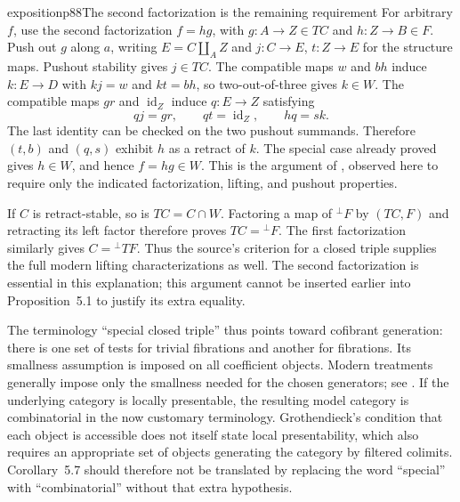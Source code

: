 \begin{dcomment}{exposition}{p88}{The second factorization is the remaining requirement}
For arbitrary $f$, use the second factorization $f=hg$, with $g:A\to Z\in TC$ and $h:Z\to B\in F$. Push out $g$ along $a$, writing $E=C\amalg_A Z$ and $j:C\to E$, $t:Z\to E$ for the structure maps. Pushout stability gives $j\in TC$. The compatible maps $w$ and $bh$ induce $k:E\to D$ with $kj=w$ and $kt=bh$, so two-out-of-three gives $k\in W$. The compatible maps $gr$ and $\operatorname{id}_Z$ induce $q:E\to Z$ satisfying
\[
 qj=gr,\qquad qt=\operatorname{id}_Z,\qquad hq=sk.
\]
The last identity can be checked on the two pushout summands. Therefore $(t,b)$ and $(q,s)$ exhibit $h$ as a retract of $k$. The special case already proved gives $h\in W$, and hence $f=hg\in W$. This is the argument of \citet[Lemma~11.3.3]{Riehl2014}, observed here to require only the indicated factorization, lifting, and pushout properties.

If $C$ is retract-stable, so is $TC=C\cap W$. Factoring a map of ${}^{\perp}F$ by $(TC,F)$ and retracting its left factor therefore proves $TC={}^{\perp}F$. The first factorization similarly gives $C={}^{\perp}TF$. Thus the source's criterion for a closed triple supplies the full modern lifting characterizations as well. The second factorization is essential in this explanation; this argument cannot be inserted earlier into Proposition~5.1 to justify its extra equality.

The terminology ``special closed triple'' thus points toward cofibrant generation: there is one set of tests for trivial fibrations and another for fibrations. Its smallness assumption is imposed on all coefficient objects. Modern treatments generally impose only the smallness needed for the chosen generators; see \citet[Theorem~2.1.14 and Definition~2.1.17]{Hovey1999}. If the underlying category is locally presentable, the resulting model category is combinatorial in the now customary terminology. Grothendieck's condition that each object is accessible does not itself state local presentability, which also requires an appropriate set of objects generating the category by filtered colimits. Corollary~5.7 should therefore not be translated by replacing the word ``special'' with ``combinatorial'' without that extra hypothesis.
\end{dcomment}

